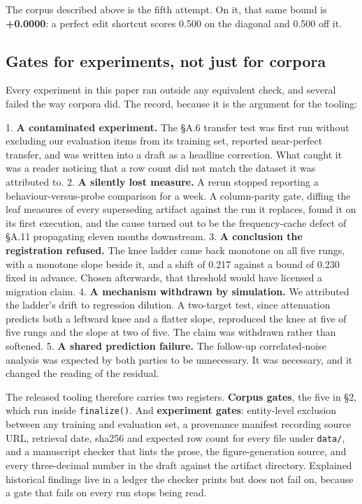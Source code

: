 \documentclass[10pt]{article}
\begin{document}
The corpus described above is the fifth attempt. On it, that same bound is \textbf{+0.0000}: a perfect edit shortcut scores 0.500 on the diagonal and 0.500 off it.

\subsection{Gates for experiments, not just for corpora}

Every experiment in this paper ran outside any equivalent check, and several failed the way corpora did. The record, because it is the argument for the tooling:

1. \textbf{A contaminated experiment.} The §A.6 transfer test was first run without excluding our evaluation items from its training set, reported near-perfect transfer, and was written into a draft as a headline correction. What caught it was a reader noticing that a row count did not match the dataset it was attributed to. 2. \textbf{A silently lost measure.} A rerun stopped reporting a behaviour-versus-probe comparison for a week. A column-parity gate, diffing the leaf measures of every superseding artifact against the run it replaces, found it on its first execution, and the cause turned out to be the frequency-cache defect of §A.11 propagating eleven months downstream. 3. \textbf{A conclusion the registration refused.} The knee ladder came back monotone on all five rungs, with a monotone slope beside it, and a shift of 0.217 against a bound of 0.230 fixed in advance. Chosen afterwards, that threshold would have licensed a migration claim. 4. \textbf{A mechanism withdrawn by simulation.} We attributed the ladder's drift to regression dilution. A two-target test, since attenuation predicts both a leftward knee and a flatter slope, reproduced the knee at five of five rungs and the slope at two of five. The claim was withdrawn rather than softened. 5. \textbf{A shared prediction failure.} The follow-up correlated-noise analysis was expected by both parties to be unnecessary. It was necessary, and it changed the reading of the residual.

The released tooling therefore carries two registers. \textbf{Corpus gates}, the five in §2, which run inside \texttt{finalize()}. And \textbf{experiment gates}: entity-level exclusion between any training and evaluation set, a provenance manifest recording source URL, retrieval date, sha256 and expected row count for every file under \texttt{data/}, and a manuscript checker that lints the prose, the figure-generation source, and every three-decimal number in the draft against the artifact directory. Explained historical findings live in a ledger the checker prints but does not fail on, because a gate that fails on every run stops being read.
\end{document}
